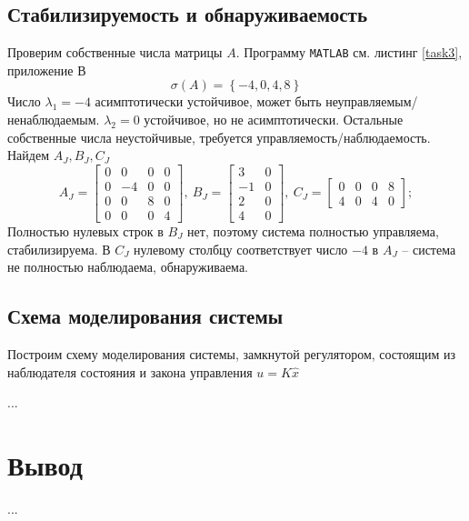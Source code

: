 \documentclass[a4paper, 12pt]{article}
\begin{document}
    \subsection{Стабилизируемость и обнаруживаемость}
    Проверим собственные числа матрицы $A$. Программу \texttt{MATLAB} см. листинг \ref{task3}, приложение В
    $$
    \sigma\left( A \right)=\left\{ -4,0,4,8 \right\}
    $$
    Число $\lambda_1=-4$ асимптотически устойчивое, может быть неуправляемым/ненаблюдаемым.
    $\lambda_2=0$ устойчивое, но не асимптотически. Остальные собственные числа неустойчивые,
    требуется управляемость/наблюдаемость. Найдем $A_J,B_J,C_J$
    $$
    A_J=\begin{bmatrix}
        0     &0     &0     &0\\
     0    &-4     &0     &0\\
     0     &0     &8     &0\\
     0     &0     &0     &4
    \end{bmatrix},\ B_J=\begin{bmatrix}
        3     &0\\
    -1     &0\\
     2     &0\\
     4     &0
    \end{bmatrix},\ C_J=\begin{bmatrix}
        0     &0     &0     &8\\
     4     &0     &4     &0
    \end{bmatrix};
    $$
    Полностью нулевых строк в $B_J$ нет, поэтому система полностью управляема,
    стабилизируема. В $C_J$ нулевому столбцу соответствует число $-4$ в $A_J$ --
    система не полностью наблюдаема, обнаруживаема.


    \subsection{Схема моделирования системы}
    Построим схему моделирования системы, замкнутой регулятором, состоящим из
    наблюдателя состояния и закона управления $u=K\hat{x}$


    ...


    \section{Вывод}
    ...
\end{document}
